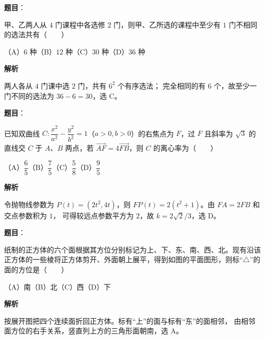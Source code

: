 \begin{answer}

\textbf{题目}：

甲、乙两人从 $4$ 门课程中各选修 $2$ 门，则甲、乙所选的课程中至少有 $1$ 门不相同的选法共有\mbox{（　　）}

（A）$6$ 种\quad（B）$12$ 种\quad（C）$30$ 种\quad（D）$36$ 种

\textbf{解析}

两人各从 $4$ 门课中选 $2$ 门，共有 $6^2$ 个有序选法；
完全相同的有 $6$ 个，故至少一门不同的选法为
$36-6=30$，选 C。


\end{answer}
\begin{answer}

\textbf{题目}：

已知双曲线 $C:\dfrac{x^2}{a^2}-\dfrac{y^2}{b^2}=1$（$a>0,b>0$）的右焦点为 $F$，过 $F$ 且斜率为 $\sqrt3$ 的直线交 $C$ 于 $A\text{、}B$ 两点，若 $\overrightarrow{AF}=4\overrightarrow{FB}$，则 $C$ 的离心率为\mbox{（　　）}

（A）$\dfrac65$\quad（B）$\dfrac75$\quad（C）$\dfrac58$\quad（D）$\dfrac95$

\textbf{解析}

令抛物线参数为 $P(t)=(2t^2,4t)$，则
$FP(t)=2(t^2+1)$。由 $FA=2FB$ 和交点参数积为 $1$，
可得较远点参数平方为 $2$，故
$k=2\sqrt2/3$，选 D。


\end{answer}
\begin{answer}

\textbf{题目}：

纸制的正方体的六个面根据其方位分别标记为上、下、东、南、西、北。现有沿该正方体的一些棱将正方体剪开、外面朝上展平，得到如图的平面图形，则标“$\triangle$”的面的方位是\mbox{（　　）}
\nopagebreak[4]
\begin{center}\end{center}
\nopagebreak[4]
（A）南\quad（B）北\quad（C）西\quad（D）下

\textbf{解析}

按展开图把四个连续面折回正方体。标有“上”的面与标有“东”的面相邻，
由相邻面方位的右手关系，竖直列上方的三角形面朝南，选 A。


\end{answer}
